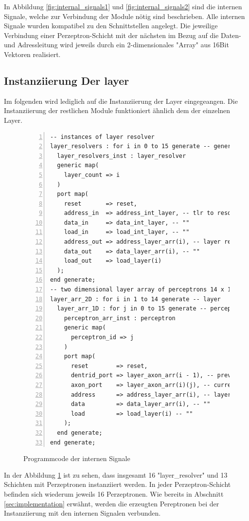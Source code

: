 \documentclass{article}
\numberwithin{equation}{section}
\begin{document}
\FloatBarrier
In Abbildung \ref{fig:internal_signals1} und \ref{fig:internal_signals2} sind die
internen Signale, welche zur Verbindung der Module nötig sind beschrieben.
Alle internen Signale wurden kompatibel zu den Schnittstellen angelegt.
Die jeweilige Verbindung einer Perzeptron-Schicht mit der nächsten im Bezug auf 
die Daten- und Adressleitung wird jeweils durch ein 2-dimensionales "Array" aus 
16Bit Vektoren realisiert.
\pagebreak
\subsection{Instanziierung Der layer}
Im folgenden wird lediglich auf die Instanziierung der Layer eingegeangen. 
Die Instanziierung der restlichen Module funktioniert ähnlich dem der einzelnen Layer.
\begin{figure}[htbp]
\begin{lstlisting}[style=VHDL,numbers=left,stepnumber=1,style=myCustomMatlabStyle,basicstyle=\footnotesize]
-- instances of layer resolver
layer_resolvers : for i in 0 to 15 generate -- generate 16 layer resolvers
  layer_resolvers_inst : layer_resolver
  generic map(
    layer_count => i
  )
  port map(
    reset       => reset,
    address_in  => address_int_layer, -- tlr to resolvers
    data_in     => data_int_layer, -- ""
    load_in     => load_int_layer, -- ""
    address_out => address_layer_arr(i), -- layer resolver to perceptron array
    data_out    => data_layer_arr(i), -- ""
    load_out    => load_layer(i)
  );
end generate;
-- two dimensional layer array of perceptrons 14 x 16 (layer x perceptron)
layer_arr_2D : for i in 1 to 14 generate -- layer
  layer_arr_1D : for j in 0 to 15 generate -- perceptron in layer
    perceptron_arr_inst : perceptron
    generic map(
      perceptron_id => j
    )
    port map(
      reset        => reset,
      dentrid_port => layer_axon_arr(i - 1), -- prev layer to current layer
      axon_port    => layer_axon_arr(i)(j), -- current to next layer
      address      => address_layer_arr(i), -- layer resolver to perceptron array
      data         => data_layer_arr(i), -- ""
      load         => load_layer(i) -- ""
    );
  end generate;
end generate;
\end{lstlisting}
\caption{Programmcode der internen Signale} \label{code:generate_layers}
\end{figure}
\FloatBarrier
In der Abbildung \ref{code:generate_layers} ist zu sehen, dass insgesamt 16 
"layer\_resolver" und 13 Schichten mit Perzeptronen instanziiert werden. In jeder 
Perzeptron-Schicht befinden sich wiederum jeweils 16 Perzeptronen. Wie bereits in 
Abschnitt \ref{sec:implementation} erwähnt, werden die erzeugten Pereptronen
bei der Instanziierung mit den internen Signalen verbunden.
\pagebreak
\end{document}
